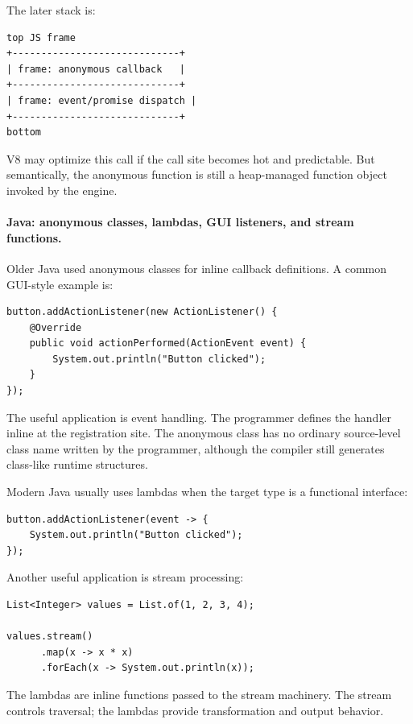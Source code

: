 The later stack is:

\begin{verbatim}
top JS frame
+-----------------------------+
| frame: anonymous callback   |
+-----------------------------+
| frame: event/promise dispatch |
+-----------------------------+
bottom
\end{verbatim}

V8 may optimize this call if the call site becomes hot and predictable. But semantically, the anonymous function is still a heap-managed function object invoked by the engine.

\paragraph{Java: anonymous classes, lambdas, GUI listeners, and stream functions.}

Older Java used anonymous classes for inline callback definitions. A common GUI-style example is:

\begin{verbatim}
button.addActionListener(new ActionListener() {
    @Override
    public void actionPerformed(ActionEvent event) {
        System.out.println("Button clicked");
    }
});
\end{verbatim}

The useful application is event handling. The programmer defines the handler inline at the registration site. The anonymous class has no ordinary source-level class name written by the programmer, although the compiler still generates class-like runtime structures.

Modern Java usually uses lambdas when the target type is a functional interface:

\begin{verbatim}
button.addActionListener(event -> {
    System.out.println("Button clicked");
});
\end{verbatim}

Another useful application is stream processing:

\begin{verbatim}
List<Integer> values = List.of(1, 2, 3, 4);

values.stream()
      .map(x -> x * x)
      .forEach(x -> System.out.println(x));
\end{verbatim}

The lambdas are inline functions passed to the stream machinery. The stream controls traversal; the lambdas provide transformation and output behavior.


